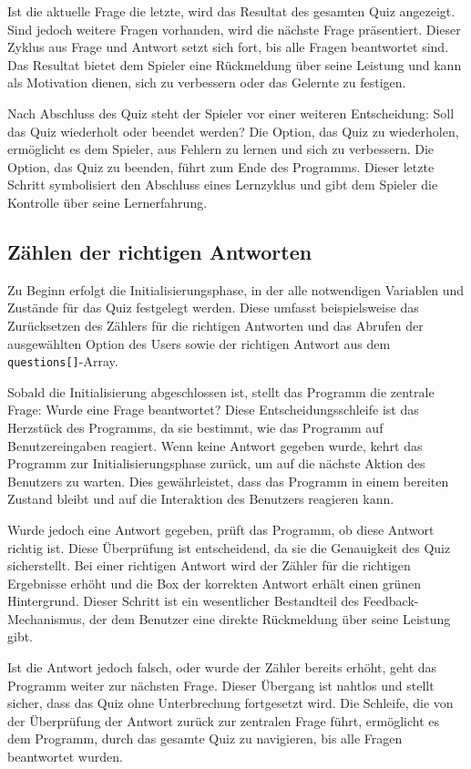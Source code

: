 \documentclass[10pt, fleqn]{scrartcl}
\begin{document}
Ist die aktuelle Frage die letzte, wird das Resultat des gesamten Quiz angezeigt. Sind jedoch weitere Fragen vorhanden, wird die nächste Frage präsentiert. Dieser Zyklus aus Frage und Antwort setzt sich fort, bis alle Fragen beantwortet sind. Das Resultat bietet dem Spieler eine Rückmeldung über seine Leistung und kann als Motivation dienen, sich zu verbessern oder das Gelernte zu festigen.

Nach Abschluss des Quiz steht der Spieler vor einer weiteren Entscheidung: Soll das Quiz wiederholt oder beendet werden? Die Option, das Quiz zu wiederholen, ermöglicht es dem Spieler, aus Fehlern zu lernen und sich zu verbessern. Die Option, das Quiz zu beenden, führt zum Ende des Programms. Dieser letzte Schritt symbolisiert den Abschluss eines Lernzyklus und gibt dem Spieler die Kontrolle über seine Lernerfahrung.

\subsection{Zählen der richtigen Antworten}

Zu Beginn erfolgt die Initialisierungsphase, in der alle notwendigen Variablen und Zustände für das Quiz festgelegt werden. Diese umfasst beispielsweise das Zurücksetzen des Zählers für die richtigen Antworten und das Abrufen der ausgewählten Option des Users sowie der richtigen Antwort aus dem \texttt{questions[]}-Array.

Sobald die Initialisierung abgeschlossen ist, stellt das Programm die zentrale Frage: Wurde eine Frage beantwortet? Diese Entscheidungsschleife ist das Herzstück des Programms, da sie bestimmt, wie das Programm auf Benutzereingaben reagiert. Wenn keine Antwort gegeben wurde, kehrt das Programm zur Initialisierungsphase zurück, um auf die nächste Aktion des Benutzers zu warten. Dies gewährleistet, dass das Programm in einem bereiten Zustand bleibt und auf die Interaktion des Benutzers reagieren kann.

Wurde jedoch eine Antwort gegeben, prüft das Programm, ob diese Antwort richtig ist. Diese Überprüfung ist entscheidend, da sie die Genauigkeit des Quiz sicherstellt. Bei einer richtigen Antwort wird der Zähler für die richtigen Ergebnisse erhöht und die Box der korrekten Antwort erhält einen grünen Hintergrund. Dieser Schritt ist ein wesentlicher Bestandteil des Feedback-Mechanismus, der dem Benutzer eine direkte Rückmeldung über seine Leistung gibt.

Ist die Antwort jedoch falsch, oder wurde der Zähler bereits erhöht, geht das Programm weiter zur nächsten Frage. Dieser Übergang ist nahtlos und stellt sicher, dass das Quiz ohne Unterbrechung fortgesetzt wird. Die Schleife, die von der Überprüfung der Antwort zurück zur zentralen Frage führt, ermöglicht es dem Programm, durch das gesamte Quiz zu navigieren, bis alle Fragen beantwortet wurden.
\end{document}
